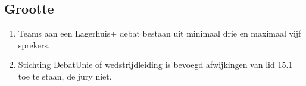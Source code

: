 \subsection{Grootte}

\begin{enumerate}
\item Teams aan een Lagerhuis+ debat bestaan uit minimaal drie en maximaal vijf sprekers.
\item Stichting DebatUnie of wedstrijdleiding is bevoegd afwijkingen van lid 15.1 toe te staan, de jury niet.
\end{enumerate}
